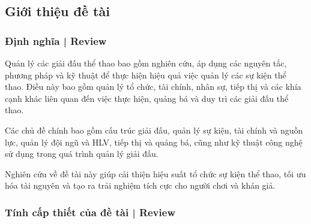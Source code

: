 \subsection{Giới thiệu đề tài}
\setcounter{figure}{0}

\subsubsection{Định nghĩa | Review  }
Quản lý các giải đấu thể thao bao gồm nghiên cứu, áp dụng các nguyên tắc, phương pháp và kỹ thuật để thực hiện hiệu quả việc quản lý các sự kiện thể thao. Điều này bao gồm quản lý tổ chức, tài chính, nhân sự, tiếp thị và các khía cạnh khác liên quan đến việc thực hiện, quảng bá và duy trì các giải đấu thể thao.
\par
Các chủ đề chính bao gồm cấu trúc giải đấu, quản lý sự kiện, tài chính và nguồn lực, quản lý đội ngũ và HLV, tiếp thị và quảng bá, cũng như kỹ thuật công nghệ sử dụng trong quá trình quản lý giải đấu.
\par
Nghiên cứu về đề tài này giúp cải thiện hiệu suất tổ chức sự kiện thể thao, tối ưu hóa tài nguyên và tạo ra trải nghiệm tích cực cho người chơi và khán giả.


\subsubsection{Tính cấp thiết của đề tài | Review}

